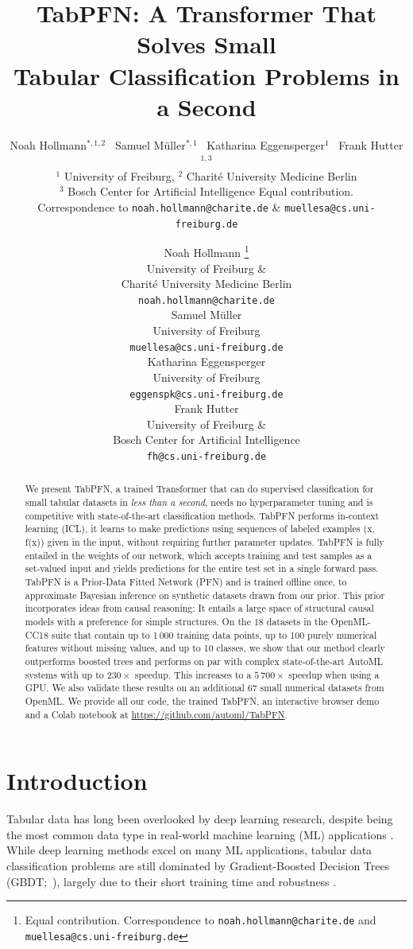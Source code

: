 \documentclass{article}
\title{TabPFN: A Transformer That Solves Small\\Tabular Classification Problems in a Second}
\author{Noah Hollmann$^{*, 1, 2}$~\; Samuel M\"uller$^{*, 1}$~\; Katharina Eggensperger$^{1}$~\; Frank Hutter$^{1, 3}$ \\
$^{1}$ University of Freiburg, $^{2}$ Charit\'e University Medicine Berlin \\ $^{3}$ Bosch Center for Artificial Intelligence
\printfnsymbol{1} Equal contribution. \\ Correspondence to \texttt{noah.hollmann@charite.de} \& \texttt{muellesa@cs.uni-freiburg.de}
}
\author{
Noah Hollmann \thanks{Equal contribution. Correspondence to \texttt{noah.hollmann@charite.de} and \texttt{muellesa@cs.uni-freiburg.de}} \\
  University of Freiburg \&\\
  Charit\'e University Medicine Berlin \\
  \texttt{noah.hollmann@charite.de} \\
  \And
  Samuel M\"uller \printfnsymbol{1} \\
  University of Freiburg \\
  \texttt{muellesa@cs.uni-freiburg.de} \\
  \AND
  Katharina Eggensperger \\
  University of Freiburg \\
  \texttt{eggenspk@cs.uni-freiburg.de} \\
  \And
  Frank Hutter \\
  University of Freiburg \&\\
  Bosch Center for Artificial Intelligence \\
  \texttt{fh@cs.uni-freiburg.de} \\
}
\begin{document}
\maketitle

\newcommand{\methodname}[0]{TabPFN}
\newcommand{\priortuning}[0]{differentiable hyperparameter tuning}
\newcommand{\openmlcc}[0]{OpenML-CC18}
\newcommand{\openmlautoml}[0]{OpenML-AutoML}
\begin{abstract}
We present \methodname{}, a trained Transformer that can do supervised classification for small tabular datasets in \textit{less than a second}, needs no hyperparameter tuning and is competitive with state-of-the-art classification methods. \methodname{} performs in-context learning (ICL), it learns to make predictions using sequences of labeled examples (x, f(x)) given in the input, without requiring further parameter updates.
\methodname{} is fully entailed in the weights of our network, which accepts training and test samples as a set-valued input and yields predictions for the entire test set in a single forward pass.
\methodname{} is a Prior-Data Fitted Network (PFN) and is trained offline once, to approximate Bayesian inference on synthetic datasets drawn from our prior.
This prior incorporates ideas from causal reasoning: It entails a large space of structural causal models with a preference for simple structures.
On the $18$ datasets in the \openmlcc{} suite that contain up to 1\,000 training data points, up to 100 purely numerical features without missing values, and up to 10 classes, we show that our method clearly outperforms boosted trees and performs on par with complex state-of-the-art AutoML systems with up to $230\times$ speedup.
This increases to a $5\,700\times$ speedup when using a GPU. We also validate these results on an additional 67 small numerical datasets from OpenML.
We provide all our code, the trained \methodname{}, an interactive browser demo and a Colab notebook at
\url{https://github.com/automl/TabPFN}.
\end{abstract}

\section{Introduction}
\label{sec:introduction}

Tabular data has long been overlooked by deep learning research, despite being the most common data type in real-world machine learning (ML) applications \citep{chui-mckinsey18a}.  
While deep learning methods excel on many ML applications, tabular data classification problems are still dominated by Gradient-Boosted Decision Trees (GBDT;~\citealp{friedman-as01a}), largely due to their short training time and robustness \citep{nnsfortabular2}.
\end{document}
